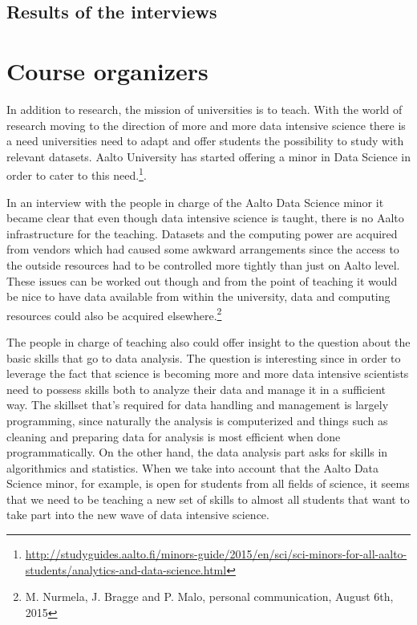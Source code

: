 \subsection{Results of the interviews}

\fi

\section{Course organizers}

In addition to research, the mission of universities is to teach. With the
world of research moving to the direction of more and more data intensive science
there is a need universities need to adapt and offer students the possibility to study with
relevant datasets. Aalto University has started offering a minor in Data
Science in order to cater to this need.\footnote{\url{http://studyguides.aalto.fi/minors-guide/2015/en/sci/sci-minors-for-all-aalto-students/analytics-and-data-science.html}}.

In an interview with the people in charge of the Aalto Data Science minor
it became clear that even though data intensive science is taught, there is no
Aalto infrastructure for the teaching. Datasets and the computing power are
acquired from vendors which had caused some awkward arrangements since the
access to the outside resources had to be controlled more tightly than just
on Aalto level. These issues can be worked out though and from the point of
teaching it would be nice to have data available from within the university,
data and computing resources could also be acquired elsewhere.\footnote{M. Nurmela,
J. Bragge and P. Malo, personal communication, August 6th, 2015}

The people in charge of teaching also could offer insight to the question about
the basic skills that go to data analysis. The question is interesting since
in order to leverage the fact that science is becoming more and more data
intensive scientists need to possess skills both to analyze their data and
manage it in a sufficient way. The skillset that's required for data handling
and management is largely programming, since naturally the analysis is
computerized and things such as cleaning and preparing data for analysis is
most efficient when done programmatically. On the other hand, the data analysis
part asks for skills in algorithmics and statistics. When we take into account
that the Aalto Data Science minor, for example, is open for students from all
fields of science, it seems that we need to be teaching a new set of skills to
almost all students that want to take part into the new wave of data intensive
science.

